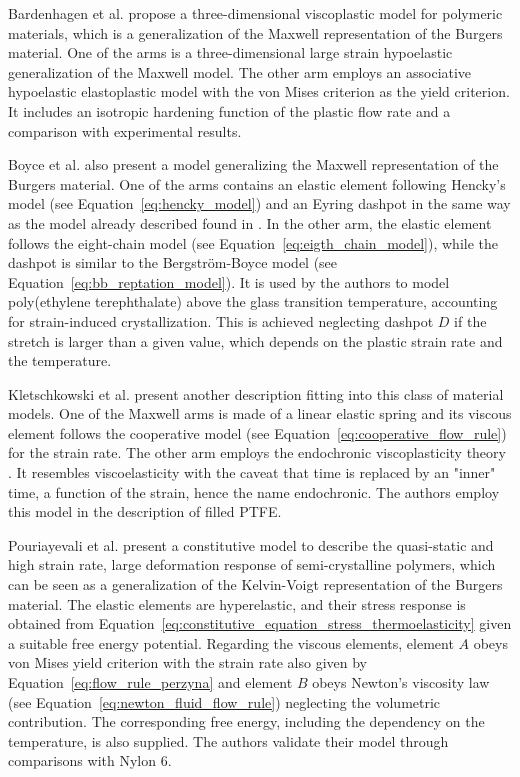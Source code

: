 Bardenhagen et al. \citep{bardenhagenThreedimensionalFiniteDeformation1997} propose a three-dimensional viscoplastic model for polymeric materials, which is a generalization of the Maxwell representation of the Burgers material.
One of the arms is a three-dimensional large strain hypoelastic generalization of the Maxwell model.
The other arm employs an associative hypoelastic elastoplastic model with the von Mises criterion as the yield criterion.
It includes an isotropic hardening function of the plastic flow rate and a comparison with experimental results.

Boyce et al. \citep{boyceConstitutiveModelFinite2000} also present a model generalizing the Maxwell representation of the Burgers material.
One of the arms contains an elastic element following Hencky's model (see Equation~\eqref{eq:hencky_model}) and an Eyring dashpot in the same way as the model already described found in \citep{boyceLargeInelasticDeformation1988}.
In the other arm, the elastic element follows the eight-chain model (see Equation~\eqref{eq:eigth_chain_model}), while the dashpot is similar to the Bergström-Boyce model (see Equation~\eqref{eq:bb_reptation_model}).
It is used by the authors to model poly(ethylene terephthalate) above the glass transition temperature, accounting for strain-induced crystallization.
This is achieved neglecting dashpot $D$ if the stretch is larger than a given value, which depends on the plastic strain rate and the temperature.

Kletschkowski et al. \citep{kletschkowskiEndochronicViscoplasticMaterial2002} present another description fitting into this class of material models.
One of the Maxwell arms is made of a linear elastic spring and its viscous element follows the cooperative model (see Equation~\eqref{eq:cooperative_flow_rule}) for the strain rate.
The other arm employs the endochronic viscoplasticity theory \citep{valanisTheoryViscoplasticityYield1970}.
It resembles viscoelasticity with the caveat that time is replaced by an "inner" time, a function of the strain, hence the name endochronic.
The authors employ this model in the description of filled PTFE.

Pouriayevali et al. \citep{pouriayevaliConstitutiveDescriptionRatesensitive2013} present a constitutive model to describe the quasi-static and high strain rate, large deformation response of semi-crystalline polymers, which can be seen as a generalization of the Kelvin-Voigt representation of the Burgers material.
The elastic elements are hyperelastic, and their stress response is obtained from Equation~\eqref{eq:constitutive_equation_stress_thermoelasticity} given a suitable free energy potential.
Regarding the viscous elements, element $A$ obeys von Mises yield criterion with the strain rate also given by Equation~\eqref{eq:flow_rule_perzyna} and element $B$ obeys Newton's viscosity law (see Equation~\eqref{eq:newton_fluid_flow_rule}) neglecting the volumetric contribution.
The corresponding free energy, including the dependency on the temperature, is also supplied.
The authors validate their model through comparisons with Nylon 6.

